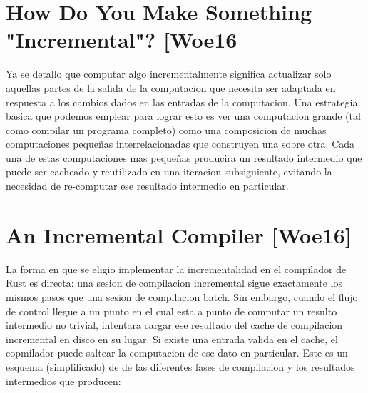 \documentclass[12pt, a4paper]{report}
\begin{document}
  \section*{How Do You Make Something "Incremental"? [Woe16}

    Ya se detallo que computar algo incrementalmente significa actualizar solo aquellas partes de la salida de la computacion que necesita ser adaptada en respuesta a los cambios dados en las entradas de la computacion.
    Una estrategia basica que podemos emplear para lograr esto es ver una computacion grande (tal como compilar un programa completo) como una composicion de muchas computaciones pequeñas interrelacionadas que construyen una sobre otra.
    Cada una de estas computaciones mas pequeñas producira un resultado intermedio que puede ser cacheado y reutilizado en una iteracion subsiguiente, evitando la necesidad de re-computar ese resultado intermedio en particular.
    \cite{rust_blog_incremental_compilation}

  \section*{An Incremental Compiler [Woe16]}

    La forma en que se eligio implementar la incrementalidad en el compilador de Rust es directa: una sesion de compilacion incremental sigue exactamente los mismos pasos que una sesion de compilacion batch.
    Sin embargo, cuando el flujo de control llegue a un punto en el cual esta a punto de computar un resulto intermedio no trivial, intentara cargar ese resultado del cache de compilacion incremental en disco en su lugar.
    Si existe una entrada valida en el cache, el copmilador puede saltear la computacion de ese dato en particular.
    Este es un esquema (simplificado) de de las diferentes fases de compilacion y los resultados intermedios que producen:
    \cite{rust_blog_incremental_compilation}
\end{document}
